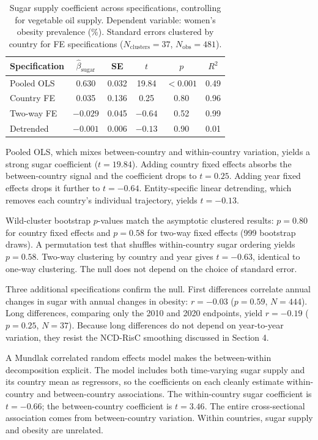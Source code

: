 \begin{table}[htbp]
\centering
\caption{Sugar supply coefficient across specifications, controlling for vegetable oil supply. Dependent variable: women's obesity prevalence (\%). Standard errors clustered by country for FE specifications ($N_{\text{clusters}} = 37$, $N_{\text{obs}} = 481$).}
\label{tab:fe_cascade}
\small
\begin{tabular}{lccccc}
\toprule
Specification & $\hat{\beta}_{\text{sugar}}$ & SE & $t$ & $p$ & $R^2$ \\
\midrule
Pooled OLS & 0.630 & 0.032 & 19.84 & $< 0.001$ & 0.49 \\
Country FE & 0.035 & 0.136 & 0.25 & 0.80 & 0.96 \\
Two-way FE & $-0.029$ & 0.045 & $-0.64$ & 0.52 & 0.99 \\
Detrended & $-0.001$ & 0.006 & $-0.13$ & 0.90 & 0.01 \\
\bottomrule
\end{tabular}
\end{table}

Pooled OLS, which mixes between-country and within-country variation, yields a strong sugar coefficient ($t = 19.84$). Adding country fixed effects absorbs the between-country signal and the coefficient drops to $t = 0.25$. Adding year fixed effects drops it further to $t = -0.64$. Entity-specific linear detrending, which removes each country's individual trajectory, yields $t = -0.13$.

Wild-cluster bootstrap $p$-values match the asymptotic clustered results: $p = 0.80$ for country fixed effects and $p = 0.58$ for two-way fixed effects (999 bootstrap draws). A permutation test that shuffles within-country sugar ordering yields $p = 0.58$. Two-way clustering by country and year gives $t = -0.63$, identical to one-way clustering. The null does not depend on the choice of standard error.

Three additional specifications confirm the null. First differences correlate annual changes in sugar with annual changes in obesity: $r = -0.03$ ($p = 0.59$, $N = 444$). Long differences, comparing only the 2010 and 2020 endpoints, yield $r = -0.19$ ($p = 0.25$, $N = 37$). Because long differences do not depend on year-to-year variation, they resist the NCD-RisC smoothing discussed in Section 4.

A Mundlak correlated random effects model \cite{mundlak1978} makes the between-within decomposition explicit. The model includes both time-varying sugar supply and its country mean as regressors, so the coefficients on each cleanly estimate within-country and between-country associations. The within-country sugar coefficient is $t = -0.66$; the between-country coefficient is $t = 3.46$. The entire cross-sectional association comes from between-country variation. Within countries, sugar supply and obesity are unrelated.

